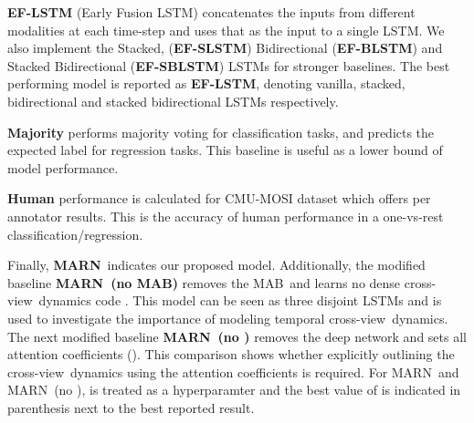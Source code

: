 \documentclass[letterpaper]{article} \usepackage{aaai18}  \usepackage{times}  \usepackage{helvet}  \usepackage{courier}  \usepackage{url}  \usepackage{graphicx}  \usepackage{multirow}
\newcommand{\pipelines}{MARN}
\newcommand{\mabs}{MAB}
\newcommand{\inter}{cross-view}
\begin{document}
\textbf{EF-LSTM} (Early Fusion LSTM) concatenates the inputs from different modalities at each time-step and uses that as the input to a single LSTM. We also implement the Stacked, (\textbf{EF-SLSTM}) Bidirectional (\textbf{EF-BLSTM}) and Stacked Bidirectional (\textbf{EF-SBLSTM}) LSTMs for stronger baselines. The best performing model is reported as \textbf{EF-LSTM},  denoting vanilla, stacked, bidirectional and stacked bidirectional LSTMs respectively.

\textbf{Majority} performs majority voting for classification tasks, and predicts the expected label for regression tasks. This baseline is useful as a lower bound of model performance. 

\textbf{Human} performance is calculated for CMU-MOSI dataset which offers per annotator results. This is the accuracy of human performance in a one-vs-rest classification/regression. 

Finally, \textbf{\pipelines}\ indicates our proposed model. Additionally, the modified baseline \textbf{\pipelines \ (no \mabs)} removes the \mabs \ and learns no dense \inter \ dynamics code . This model can be seen as three disjoint LSTMs and is used to investigate the importance of modeling temporal \inter \ dynamics. The next modified baseline \textbf{\pipelines \ (no )} removes the  deep network and sets all  attention coefficients  (). This comparison shows whether explicitly outlining the \inter \ dynamics using the attention coefficients is required. For \pipelines \ and \pipelines \ (no ),  is treated as a hyperparamter and the best value of  is indicated in parenthesis next to the best reported result.

\iffalse
\textbf{RNTN} (Recursive Neural Tensor Network) \cite{socher2013recursive} is a well-known sentiment analysis method that leverages the sentiment of words and their dependency structure.

\textbf{DAN} (Deep Average Network) \cite{iyyer2015deep} is a simple but efficient sentiment analysis model that uses information only from distributional representation of the words. 

\textbf{D-CNN} (DynamicCNN) \cite{kalchbrenner2014convolutional} is among the state-of-the-art models in text-based sentiment analysis which uses a convolutional architecture adopted for the semantic modeling of sentences.

Finally, any model with ``text'' appended denotes the model trained only on the textual modality of the video clips.
\fi
\end{document}

